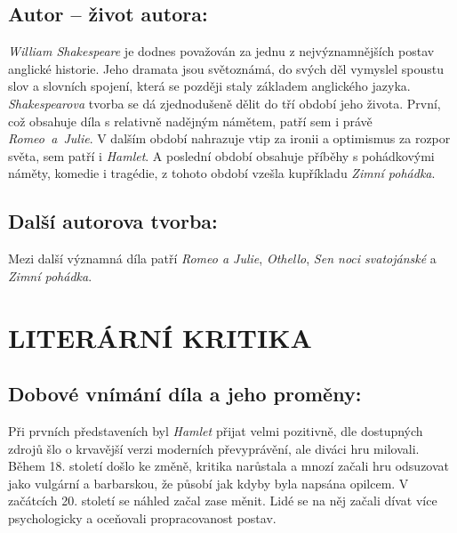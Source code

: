 \documentclass{extarticle} %
\begin{document}


\subsection*{Autor {\ssmall -- život autora:}}
\noindent 
\textit{William Shakespeare} je dodnes považován za jednu z nejvýznamnějších postav anglické historie.
Jeho dramata jsou světoznámá, do svých děl vymyslel spoustu slov a slovních spojení, která se později staly základem anglického jazyka. \\
\textit{Shakespearova} tvorba se dá zjednodušeně dělit do tří období jeho života.
První, což obsahuje díla s relativně nadějným námětem, patří sem i právě \textit{Romeo~a~Julie}.
V dalším období nahrazuje vtip za ironii a optimismus za rozpor světa, sem patří i \textit{Hamlet}.
A poslední období obsahuje příběhy s pohádkovými náměty, komedie i tragédie, z tohoto období vzešla kupříkladu \textit{Zimní pohádka}.

\subsection*{Další autorova tvorba:}
\noindent 
Mezi další významná díla patří \textit{Romeo a Julie}, \textit{Othello}, \textit{Sen noci svatojánské} a \textit{Zimní pohádka}.

\section*{LITERÁRNÍ KRITIKA}

\subsection*{Dobové vnímání díla a jeho proměny:}
\noindent
Při prvních představeních byl \textit{Hamlet} přijat velmi pozitivně, dle dostupných zdrojů šlo o krvavější verzi moderních převyprávění, ale diváci hru milovali.
Během 18. století došlo ke změně, kritika narůstala a mnozí začali hru odsuzovat jako vulgární a barbarskou, že působí jak kdyby byla napsána opilcem.
V začátcích 20. století se náhled začal zase měnit.
Lidé se na něj začali dívat více psychologicky a oceňovali propracovanost postav.
\end{document}
